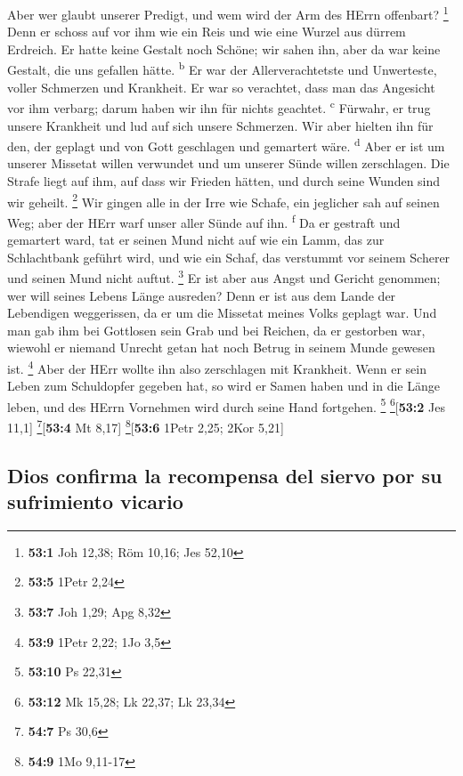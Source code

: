  Aber wer glaubt unserer Predigt, und wem wird der Arm des
HErrn offenbart? \footnote{\textbf{53:1} Joh 12,38; Röm 10,16; Jes 52,10}
 Denn er schoss auf vor ihm wie ein Reis und wie eine
Wurzel aus dürrem Erdreich. Er hatte keine Gestalt noch Schöne; wir
sahen ihn, aber da war keine Gestalt, die uns gefallen hätte.
\textsuperscript{b}  Er war der Allerverachtetste und
Unwerteste, voller Schmerzen und Krankheit. Er war so verachtet, dass
man das Angesicht vor ihm verbarg; darum haben wir ihn für nichts
geachtet. \textsuperscript{c}  Fürwahr, er trug unsere
Krankheit und lud auf sich unsere Schmerzen. Wir aber hielten ihn für
den, der geplagt und von Gott geschlagen und gemartert wäre.
\textsuperscript{d}  Aber er ist um unserer Missetat
willen verwundet und um unserer Sünde willen zerschlagen. Die Strafe
liegt auf ihm, auf dass wir Frieden hätten, und durch seine Wunden sind
wir geheilt. \footnote{\textbf{53:5} 1Petr 2,24}  Wir
gingen alle in der Irre wie Schafe, ein jeglicher sah auf seinen Weg;
aber der HErr warf unser aller Sünde auf ihn. \textsuperscript{f}
 Da er gestraft und gemartert ward, tat er seinen Mund
nicht auf wie ein Lamm, das zur Schlachtbank geführt wird, und wie ein
Schaf, das verstummt vor seinem Scherer und seinen Mund nicht auftut.
\footnote{\textbf{53:7} Joh 1,29; Apg 8,32}  Er ist aber
aus Angst und Gericht genommen; wer will seines Lebens Länge ausreden?
Denn er ist aus dem Lande der Lebendigen weggerissen, da er um die
Missetat meines Volks geplagt war.  Und man gab ihm bei
Gottlosen sein Grab und bei Reichen, da er gestorben war, wiewohl er
niemand Unrecht getan hat noch Betrug in seinem Munde gewesen ist.
\footnote{\textbf{53:9} 1Petr 2,22; 1Jo 3,5}  Aber der
HErr wollte ihn also zerschlagen mit Krankheit. Wenn er sein Leben zum
Schuldopfer gegeben hat, so wird er Samen haben und in die Länge leben,
und des HErrn Vornehmen wird durch seine Hand fortgehen. \footnote{\textbf{53:10}
  Ps 22,31} \footnote{\textbf{53:12} Mk 15,28; Lk 22,37; Lk 23,34}{[}\textbf{53:2}
Jes 11,1{]} \footnote{\textbf{54:7} Ps 30,6}{[}\textbf{53:4} Mt 8,17{]}
\footnote{\textbf{54:9} 1Mo 9,11-17}{[}\textbf{53:6} 1Petr 2,25; 2Kor
5,21{]}

\hypertarget{dios-confirma-la-recompensa-del-siervo-por-su-sufrimiento-vicario}{%
\subsection{Dios confirma la recompensa del siervo por su sufrimiento
vicario}\label{dios-confirma-la-recompensa-del-siervo-por-su-sufrimiento-vicario}}

